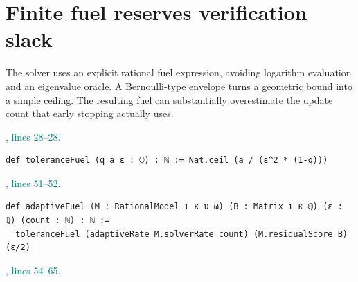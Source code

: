 \documentclass[11pt]{article}\usepackage{needspace}\renewcommand{\paperkind}{Lean companion}\setlength{\parskip}{0.35em}
\begin{document}
\section{Finite fuel reserves verification slack}

The solver uses an explicit rational fuel expression, avoiding logarithm evaluation and an eigenvalue oracle. A Bernoulli-type envelope turns a geometric bound into a simple ceiling. The resulting fuel can substantially overestimate the update count that early stopping actually uses.



{\small\textcolor{teal}{, lines 28--28.}\par}

\begin{lstlisting}[style=BayesSource]
def toleranceFuel (q a ε : ℚ) : ℕ := Nat.ceil (a / (ε^2 * (1-q)))
\end{lstlisting}



{\small\textcolor{teal}{, lines 51--52.}\par}

\begin{lstlisting}[style=BayesSource]
def adaptiveFuel (M : RationalModel ι κ υ ω) (B : Matrix ι κ ℚ) (ε : ℚ) (count : ℕ) : ℕ :=
  toleranceFuel (adaptiveRate M.solverRate count) (M.residualScore B) (ε/2)
\end{lstlisting}



{\small\textcolor{teal}{, lines 54--65.}\par}
\end{document}
